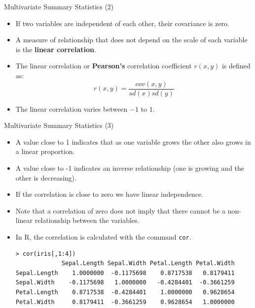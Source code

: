 \documentclass[handout]{beamer}
\begin{document}
\begin{frame}[fragile]{Multivariate Summary Statistics (2)}
\scriptsize{
\begin{itemize}
 \item If two variables are independent of each other, their covariance is zero.
 \item A measure of relationship that does not depend on the scale of each variable is the \textbf{linear correlation}.
 \item The linear correlation or \textbf{Pearson's} correlation coefficient $r(x,y)$ is defined as: 
 \begin{displaymath}
  r(x,y)=\frac{cov(x,y)}{sd(x)sd(y)}
 \end{displaymath}
\item  The linear correlation varies between $-1$ to $1$. 

\end{itemize}



}
\end{frame}



\begin{frame}[fragile]{Multivariate Summary Statistics (3)}
\scriptsize{
\begin{itemize}
\item A value close to 1 indicates that as one variable grows the other also grows in a linear proportion. 
\item A value close to -1 indicates an inverse relationship (one is growing and the other is decreasing). 
\item If the correlation is close to zero we have linear independence. 
\item Note that a correlation of zero does not imply that there cannot be a non-linear relationship between the variables.
\item In R, the correlation is calculated with the command \verb+cor+.
\begin{verbatim}
> cor(iris[,1:4])
             Sepal.Length Sepal.Width Petal.Length Petal.Width
Sepal.Length    1.0000000  -0.1175698    0.8717538   0.8179411
Sepal.Width    -0.1175698   1.0000000   -0.4284401  -0.3661259
Petal.Length    0.8717538  -0.4284401    1.0000000   0.9628654
Petal.Width     0.8179411  -0.3661259    0.9628654   1.0000000
\end{verbatim}

 
 
\end{itemize}



}
\end{frame}
\end{document}
